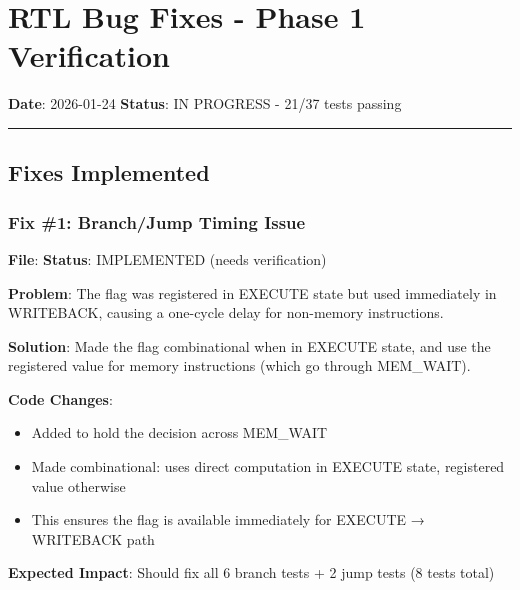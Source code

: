 \section{RTL Bug Fixes - Phase 1 Verification}\label{cr:fix:rtl-bug-fixes}

\begin{record}

\textbf{Date}: 2026-01-24 \textbf{Status}: IN PROGRESS - 21/37 tests
passing

\begin{center}\rule{0.5\linewidth}{0.5pt}\end{center}

\end{record}

\subsection{\texorpdfstring{\ok{} Fixes
Implemented}{ Fixes Implemented}}\label{cr:fix:rtl-bug-fixes:white-check-mark-fixes-implemented}

\subsubsection{\texorpdfstring{Fix \#1: Branch/\allowbreak{}Jump Timing
Issue}{Fix \#1: Branch/Jump Timing Issue}}\label{cr:fix:rtl-bug-fixes:fix-1-branchjump-timing-issue}

\begin{record}

\textbf{File}:  \textbf{Status}:
\ok{} IMPLEMENTED (needs verification)

\textbf{Problem}: The  flag was registered in
EXECUTE state but used immediately in WRITEBACK, causing a one-cycle
delay for non-memory instructions.

\textbf{Solution}: Made the flag combinational when in EXECUTE state,
and use the registered value for memory instructions (which go through
MEM\_\allowbreak{}WAIT).

\textbf{Code Changes}:

\begin{itemize}
\tightlist
\item
  Added  to hold the decision across
  MEM\_WAIT
\item
  Made  combinational: uses direct computation in
  EXECUTE state, registered value otherwise
\item
  This ensures the flag is available immediately for EXECUTE → WRITEBACK
  path
\end{itemize}

\textbf{Expected Impact}: Should fix all 6 branch tests + 2 jump tests
(8 tests total)

\end{record}

